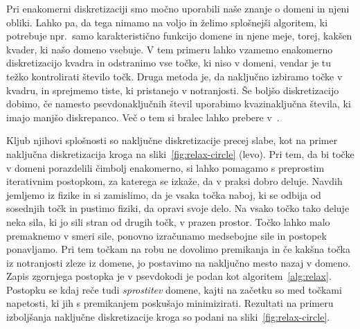 \documentclass[12pt,a4paper]{article}
\theoremstyle{definition} %
\theoremstyle{plain} %
\newcommand{\ang}[1]{\text{(\textit{angl.} #1)}}
\begin{document}
Pri enakomerni diskretizaciji smo močno uporabili naše znanje o domeni in njeni
obliki. Lahko pa, da tega nimamo na voljo in želimo splošnejši algoritem, ki
potrebuje npr.~samo karakteristično funkcijo domene in njene meje, torej, kakšen
kvader, ki našo domeno vsebuje.
V tem primeru lahko vzamemo enakomerno diskretizacijo kvadra in odstranimo vse
točke, ki niso v domeni, vendar je tu težko kontrolirati število točk.
Druga metoda je, da naključno izbiramo točke v kvadru, in sprejmemo tiste, ki
pristanejo v notranjosti. Še boljšo diskretizacijo dobimo, če namesto
psevdonaključnih števil uporabimo kvazinaključna števila, ki imajo manjšo
diskrepanco. Več o tem si bralec lahko prebere v~\cite{morokoff1994quasi}.

Kljub njihovi splošnosti so naključne diskretizacije precej slabe, kot na primer
naključna diskretizacija kroga na sliki~\ref{fig:relax-circle} (levo).
Pri tem, da bi točke v domeni porazdelili čimbolj enakomerno, si lahko pomagamo
s preprostim iterativnim postopkom, za katerega se izkaže, da v praksi dobro
deluje. Navdih jemljemo iz fizike in si zamislimo, da je vsaka točka naboj, ki
se odbija od sosednjih točk in pustimo fiziki, da opravi svoje delo.
Na vsako točko tako deluje neka sila, ki jo sili
stran od drugih točk, v prazen prostor. Točko lahko malo premaknemo v smeri
sile, ponovno izračunamo medsebojne sile in postopek ponavljamo. Pri tem točkam
na robu ne dovolimo premikanja in če kakšna točka iz notranjosti zleze iz
domene, jo postavimo na naključno mesto nazaj v domeno. Zapis zgornjega postopka
je v psevdokodi je podan kot algoritem~\ref{alg:relax}. Postopku se kdaj reče
tudi \emph{sprostitev} \ang{relaxation} domene, kajti na začetku so med točkami
napetosti, ki jih s premikanjem poskušajo minimizirati. Rezultati na primeru
izboljšanja naključne diskretizacije kroga so podani na
sliki~\ref{fig:relax-circle}.
\end{document}
